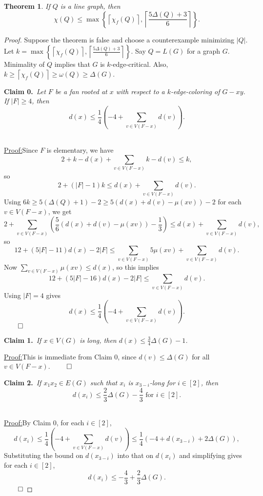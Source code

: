 \documentclass[12pt]{amsart}
\theoremstyle{plain}
\newtheorem{thm}{Theorem}
\theoremstyle{definition}
\theoremstyle{remark}
\newcommand{\set}[1]{\left\{ #1 \right\}}
\newcommand{\card}[1]{\left|#1\right|}
\newcommand{\ceil}[1]{\left\lceil#1\right\rceil}
\newcommand{\irange}[1]{\left[#1\right]}
\newcommand{\parens}[1]{\left( #1 \right)}
\newcommand{\claim}[2]{{\noindent\bf Claim #1.}~{\it #2}~~}
\newenvironment{claimproof}[1]{\par\noindent\underline{Proof:}\space#1}{\leavevmode\unskip\penalty9999
\hbox{}\nobreak\hfill\quad\hbox{$\qed$}}
\begin{document}
\begin{thm}
If $Q$ is a line graph, then
\[\chi(Q) \le \max\set{\ceil{\chi_f(Q)}, \ceil{\frac{5\Delta(Q) + 3}{6}}}.\]
\end{thm}
\begin{proof}
Suppose the theorem is false and choose a counterexample minimizing $\card{Q}$.
Let $k = \max\set{\ceil{\chi_f(Q)}, \ceil{\frac{5\Delta(Q) + 3}{6}}}$. Say $Q =
L(G)$ for a graph $G$. Minimality of $Q$ implies that $G$ is $k$-edge-critical.
Also, $k \ge \ceil{\chi_f(Q)} \ge \omega(Q) \ge \Delta(G)$.

\bigskip

\claim{0}{Let $F$ be a fan rooted at $x$ with respect to a $k$-edge-coloring of $G - xy$.  If $|F| \ge 4$, then
\[d(x) \le \frac14\parens{-4 + \sum_{v \in V(F-x)} d(v)}.\]}
\begin{claimproof}
Since $F$ is elementary, we have
\[2 + k-d(x) + \sum_{v \in V(F-x)} k - d(v) \le k,\]
so
\[2 + (|F| - 1)k \le d(x) + \sum_{v \in V(F-x)} d(v).\]
Using $6k \ge 5(\Delta(Q) + 1) - 2 \ge 5(d(x) + d(v) - \mu(xv)) - 2$ for each $v \in V(F-x)$, we get
\[2 + \sum_{v \in V(F-x)}\parens{\frac56(d(x) + d(v) - \mu(xv)) -\frac13} \le d(x) + \sum_{v \in V(F-x)} d(v),\]
so
\[12 + \parens{5|F| - 11}d(x) - 2|F| \le \sum_{v \in V(F-x)} 5\mu(xv) + \sum_{v \in V(F-x)} d(v).\]
Now $\sum_{v \in V(F-x)} \mu(xv) \le d(x)$, so this implies
\[12 + \parens{5|F| - 16}d(x) - 2|F| \le \sum_{v \in V(F-x)} d(v).\]
Using $|F| = 4$ gives
\[d(x) \le \frac14\parens{-4 + \sum_{v \in V(F-x)} d(v)}.\]
\end{claimproof}
\bigskip

\claim{1}{If $x \in V(G)$ is long, then $d(x) \le \frac34\Delta(G) - 1$.}

\begin{claimproof}
This is immediate from Claim 0, since $d(v)\le \Delta(G)$ for all $v\in V(F-x)$.
\end{claimproof}
\bigskip

\claim{2}{If $x_1x_2 \in E(G)$ such that $x_i$ is $x_{3-i}$-long for $i \in \irange{2}$, then
\[d(x_i) \le \frac23\Delta(G) -\frac43 \text{ for $i \in \irange{2}$.}\]}

\begin{claimproof}
By Claim 0, for each $i \in \irange{2}$,
\[d(x_i) \le \frac14\parens{-4 + \sum_{v \in V(F-x)} d(v)} \le \frac14\parens{-4 + d(x_{3-i}) + 2\Delta(G)},\]
Substituting the bound on $d(x_{3-i})$ into that on $d(x_i)$ and simplifying
gives for each $i \in \irange{2}$,
\[d(x_i) \le -\frac43 + \frac23\Delta(G).\]
\end{claimproof}


\end{proof}
\end{document}
